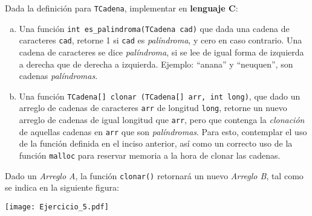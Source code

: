 \documentclass[12pt,a4paper]{article}
\begin{document}
 Dada la definición para \texttt{TCadena}, implementar en \textbf{lenguaje C}:
\begin{enumerate}[a)]
	\item Una función \texttt{int es\_palindroma(TCadena cad)} que dada una cadena de caracteres \texttt{cad}, retorne 1 si \texttt{cad} es \textit{palíndroma}, y cero en caso contrario. Una cadena de caracteres se dice \textit{palíndroma}, si se lee de igual forma de izquierda a derecha que de derecha a izquierda. Ejemplo: ``anana'' y ``neuquen'', son cadenas \textit{palíndromas}.
	\item Una función \texttt{TCadena[] clonar (TCadena[] arr, int long)}, que dado un arreglo de cadenas de caracteres \texttt{arr} de longitud \texttt{long}, retorne un nuevo arreglo de cadenas de igual longitud que \texttt{arr}, pero que contenga la \textit{clonación} de aquellas cadenas en \texttt{arr} que son \textit{palíndromas}. Para esto, contemplar el uso de la función definida en el inciso anterior, así como un correcto uso de la función \texttt{malloc} para reservar memoria a la hora de clonar las cadenas.
\end{enumerate}
Dado un \textit{Arreglo A}, la función \texttt{clonar()} retornará un nuevo \textit{Arreglo B}, tal como se indica en la siguiente figura:\\
\begin{centering}
	\texttt{[image: Ejercicio\_5.pdf]} 
\end{centering}
\end{document}
